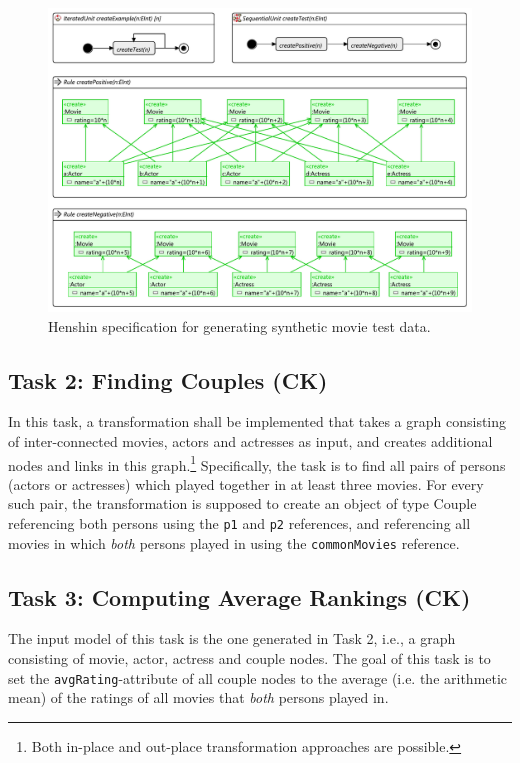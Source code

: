 \documentclass[a4paper,11pt]{article}
\begin{document}
\begin{figure}[p]
\centering
\includegraphics[scale=1.0,angle=90]{gen-test-data3}
\caption{Henshin specification for generating synthetic movie test data.}
\label{fig:gen-test-data}
\end{figure}

\subsection{Task 2: Finding Couples (CK)}

In this task, a transformation shall be implemented that takes a graph
consisting of inter-connected movies, actors and actresses as input, and
creates additional nodes and links in this graph.\footnote{Both in-place and
  out-place transformation approaches are possible.} Specifically, the task is
to find all pairs of persons (actors or actresses) which played together in at
least three movies.  For every such pair, the transformation is supposed to
create an object of type \textsf{Couple} referencing both persons using the
\verb|p1| and \verb|p2| references, and referencing all movies in which
\emph{both} persons played in using the \verb|commonMovies| reference.


\subsection{Task 3: Computing Average Rankings (CK)}

The input model of this task is the one generated in Task 2,
i.e., a graph consisting of movie, actor, actress and couple
nodes. The goal of this task is to set the \verb|avgRating|-attribute
of all couple nodes to the average (i.e. the
arithmetic mean) of the ratings of all movies that
\emph{both} persons played in.
\end{document}
